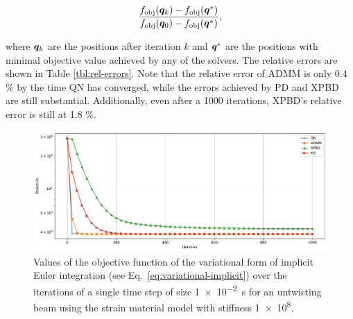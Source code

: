 \begin{equation}\label{eq:rel-error}
    \frac{f_{\text{obj}}(\bm{q}_k) - f_{\text{obj}}(\bm{q}^*)}{f_{\text{obj}}(\bm{q}_0) - f_{\text{obj}}(\bm{q}^*)},
\end{equation}

\noindent where $\bm{q}_k$ are the positions after iteration $k$ and $\bm{q}^*$ are the positions with minimal objective value
achieved by any of the solvers. The relative errors are shown in Table \ref{tbl:rel-errors}. Note that the relative error of ADMM is only 
0.4 \% by the time QN has converged, while the errors achieved by PD and XPBD are still substantial. Additionally, even after a 1000 iterations, XPBD's relative error 
is still at 1.8 \%.

\begin{figure}[h]
    \includegraphics[width=\textwidth]{figures/strain_beam_untwist_objectives.pdf}
    \caption{Values of the objective function of the variational form of implicit Euler integration (see Eq.\ \ref{eq:variational-implicit}) over the iterations of a single time 
        step of size \SI{1e-2}{\second} for an untwisting beam using the strain material model with stiffness \num{1e8}.}
    \label{fig:strain-beam-untwist-objectives}
\end{figure}

